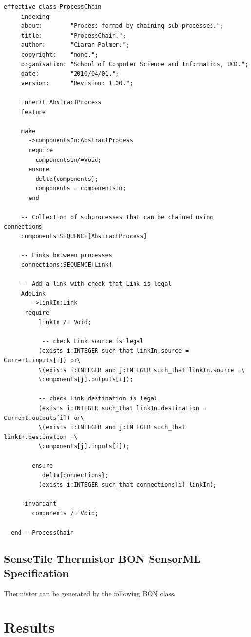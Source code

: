\documentclass[]{final_report}
\begin{document}
\begin{lstlisting}[basicstyle=\scriptsize,showspaces=false,showstringspaces=false, caption=BON ProcessChaing]  
effective class ProcessChain
     indexing
     about:        "Process formed by chaining sub-processes.";
     title:        "ProcessChain.";
     author:       "Ciaran Palmer.";
     copyright:    "none.";
     organisation: "School of Computer Science and Informatics, UCD.";
     date:         "2010/04/01.";
     version:      "Revision: 1.00.";

     inherit AbstractProcess
     feature
     
     make
       ->componentsIn:AbstractProcess
       require
         componentsIn/=Void;         
       ensure
         delta{components};
         components = componentsIn;
       end
     
     -- Collection of subprocesses that can be chained using connections      
     components:SEQUENCE[AbstractProcess]
     
     -- Links between processes
     connections:SEQUENCE[Link]
     
     -- Add a link with check that Link is legal
     AddLink
        ->linkIn:Link
      require
          linkIn /= Void;

           -- check Link source is legal
          (exists i:INTEGER such_that linkIn.source = Current.inputs[i]) or\
          \(exists i:INTEGER and j:INTEGER such_that linkIn.source =\
          \components[j].outputs[i]);

          -- check Link destination is legal
          (exists i:INTEGER such_that linkIn.destination = Current.outputs[i]) or\
          \(exists i:INTEGER and j:INTEGER such_that linkIn.destination =\
          \components[j].inputs[i]);

        ensure
           delta{connections};
          (exists i:INTEGER such_that connections[i] linkIn);
      
      invariant
        components /= Void;
        
  end --ProcessChain
 \end{lstlisting}


\section{SenseTile Thermistor BON SensorML Specification }
Thermistor can be generated by the following BON class.

\chapter{Results}
\end{document}
